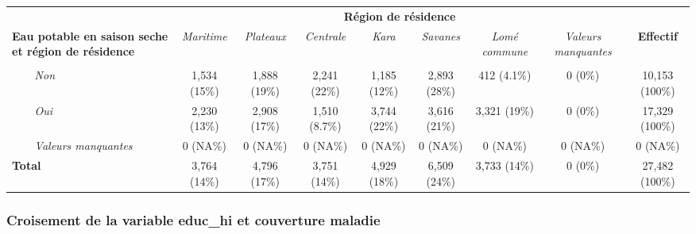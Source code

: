 \documentclass[
]{article}
\begin{document}
\begin{table}[!t]
\fontsize{12.0pt}{14.4pt}\selectfont
\begin{tabular*}{\linewidth}{@{\extracolsep{\fill}}lcccccccc}
\toprule
 & \multicolumn{7}{c}{\textbf{Région de résidence}} &  \\ 
\cmidrule(lr){2-8}
\textbf{Eau potable en saison seche et région de résidence} & \emph{Maritime} & \emph{Plateaux} & \emph{Centrale} & \emph{Kara} & \emph{Savanes} & \emph{Lomé commune} & \emph{Valeurs manquantes} & \textbf{Effectif} \\ 
\midrule\addlinespace[2.5pt]
{\bfseries Accès à l'eau potable en saison seche} &  &  &  &  &  &  &  &  \\ 
{\itshape     Non} & 1,534 (15\%) & 1,888 (19\%) & 2,241 (22\%) & 1,185 (12\%) & 2,893 (28\%) & 412 (4.1\%) & 0 (0\%) & 10,153 (100\%) \\ 
{\itshape     Oui} & 2,230 (13\%) & 2,908 (17\%) & 1,510 (8.7\%) & 3,744 (22\%) & 3,616 (21\%) & 3,321 (19\%) & 0 (0\%) & 17,329 (100\%) \\ 
{\itshape     Valeurs manquantes} & 0 (NA\%) & 0 (NA\%) & 0 (NA\%) & 0 (NA\%) & 0 (NA\%) & 0 (NA\%) & 0 (NA\%) & 0 (NA\%) \\ 
{\bfseries Total} & 3,764 (14\%) & 4,796 (17\%) & 3,751 (14\%) & 4,929 (18\%) & 6,509 (24\%) & 3,733 (14\%) & 0 (0\%) & 27,482 (100\%) \\ 
\bottomrule
\end{tabular*}
\end{table}

\subsubsection{Croisement de la variable educ\_hi et couverture
maladie}\label{croisement-de-la-variable-educ_hi-et-couverture-maladie}
\end{document}
